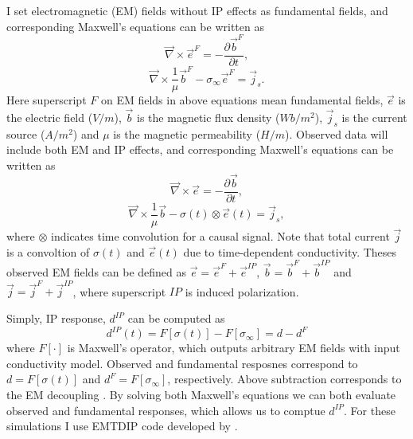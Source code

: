 \documentclass[letterpaper,11pt]{article}
\newcommand{\curl}{{\vec \nabla}\times}
\newcommand{\siginf}{\sigma_\infty}
\renewcommand {\j}  { {\vec j} }
\renewcommand {\b}  { {\vec b} }
\newcommand {\e}  { {\vec e} }
\newcommand{\dip}{d^{IP}}
\begin{document}
I set electromagnetic (EM) fields without IP effects as fundamental fields, and corresponding Maxwell’s equations can be written as 
\begin{equation}
  \curl \e^{F} = -\frac{\partial \b^{F}}{\partial t},
  \label{eq: eq_primary_farad}
\end{equation}
\begin{equation}
  \curl{\frac{1}{\mu}\b^{F}} -\siginf\e^{F} = \j_s.
  \label{eq: eq_primary_coulomb}
\end{equation}
Here superscript $F$ on EM fields in above equations mean fundamental fields, $\e$ is the electric field ($V/m$), $\b$ is the magnetic flux density ($Wb/m^2$), $\j_{s}$ is the current source ($A/m^2$) and $\mu$ is the magnetic permeability ($H/m$).
Observed data will include both EM and IP effects, and corresponding Maxwell’s equations can be written as
\begin{equation}
  \curl{\e} = -\frac{\partial \b}{\partial t},
  \label{eq: total_farad}
\end{equation}
\begin{equation}
  \curl{\frac{1}{\mu}\b} - \sigma(t)\otimes\e(t)= \j_{s},
  \label{eq: total_coulomb}
\end{equation}
where $\otimes$ indicates time convolution for a causal signal. Note that total current $\j$ is a convoltion of $\sigma(t)$ and $\e(t)$ due to time-dependent conductivity. 
Theses observed EM fields can be defined as $\e = \e^{F} + \e^{IP}$, $\b = \b^{F} + \b^{IP}$ and $\j = \j^{F} + \j^{IP}$, where superscript $IP$ is induced polarization. 

Simply, IP response, $\dip$ can be computed as 
\begin{equation}
  \dip(t) = F[\sigma(t)] - F[\siginf] = d-d^F
\end{equation}
where $F[\cdot]$ is Maxwell's operator, which outputs arbitrary EM fields with input conductivity model. Observed and fundamental resposnes correspond to $d=F[\sigma(t)]$ and $d^F=F[\siginf]$, respectively. 
Above subtraction corresponds to the EM decoupling \cite[]{Pelton1978,routh2001}. By solving both Maxwell’s equations we can both evaluate observed and fundamental responses, which allows us to comptue $\dip$. For these simulations I use EMTDIP code developed by \cite{Marchant2014}. 
\end{document}
